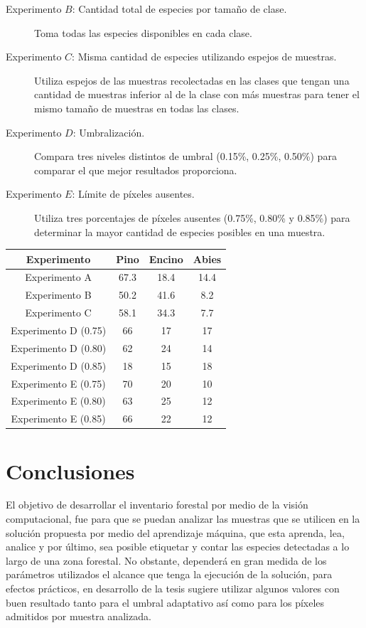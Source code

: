 \documentclass[a0,portrait]{a0poster}
\begin{document}
\begin{multicols}{2}
\begin{description}
\item[Experimento $B$:  Cantidad total de especies por tamaño de clase.]{Toma todas las especies disponibles en cada clase.}

\item[Experimento $C$: Misma cantidad de especies utilizando espejos de muestras.]{Utiliza espejos de las muestras recolectadas en las clases que tengan una cantidad de muestras inferior al de la clase con más muestras para tener el mismo tamaño de muestras en todas las clases.}

\item[Experimento $D$: Umbralización.]{Compara tres niveles distintos de umbral  (0.15\%, 0.25\%, 0.50\%) para comparar el que mejor resultados proporciona.} 

\item[Experimento $E$: Límite de píxeles ausentes.]{Utiliza tres porcentajes de píxeles ausentes (0.75\%, 0.80\% y 0.85\%) para determinar la mayor cantidad de especies posibles en una muestra.}
\end{description}

\begin{center}
\begin{tabular}{|c|c|c|c|}
			\hline
			 \textbf{Experimento} & \textbf{Pino} & \textbf{Encino} & \textbf{Abies}\\
			\hline
			Experimento A & 67.3 & 18.4 & 14.4\\
			\hline
			Experimento B & 50.2 & 41.6 & 8.2\\
			\hline
			Experimento C & 58.1 & 34.3 & 7.7\\
			\hline
			Experimento D (0.75) & 66 & 17 & 17\\
			\hline
			Experimento D (0.80) & 62 & 24 & 14\\
			\hline
			Experimento D (0.85) & 18 & 15 & 18\\
			\hline
			Experimento E (0.75) & 70 & 20 & 10\\
			\hline
			Experimento E (0.80) & 63 & 25 & 12\\
			\hline
			Experimento E (0.85) & 66 & 22 & 12\\
			\hline
		\end{tabular}
\end{center}

\vspace*{-15mm}
\section*{Conclusiones}
El objetivo de desarrollar el inventario forestal por medio de la visión computacional, fue para que se puedan analizar las muestras que se utilicen en la solución propuesta por medio del aprendizaje máquina, que esta aprenda, lea, analice y por último, sea posible etiquetar y contar las especies detectadas a lo largo de una zona forestal. No obstante, dependerá en gran medida de los parámetros utilizados el alcance que tenga la ejecución de la solución, para efectos prácticos, en desarrollo de la tesis sugiere utilizar algunos valores con buen resultado tanto para el umbral adaptativo así como para los píxeles admitidos por muestra analizada.
\vspace*{-10mm}

\end{multicols}
\end{document}
